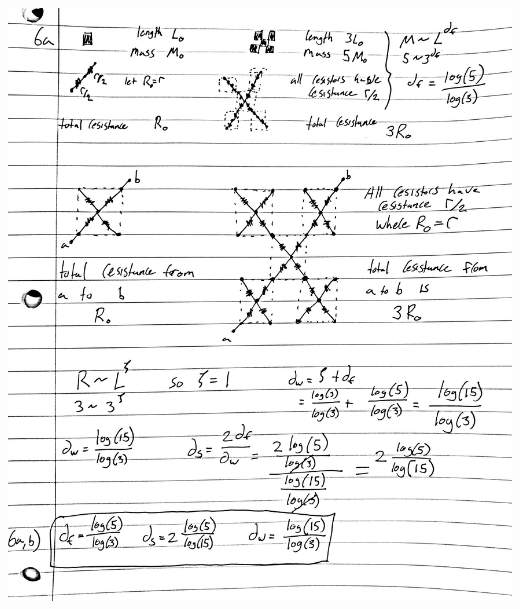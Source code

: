 \documentclass[12pt]{amsart}
\theoremstyle{definition}
\begin{document}
\begin{enumerate}
    \includegraphics[width=\textwidth]{202211291843391000.jpg}
\end{enumerate}
\end{document}
